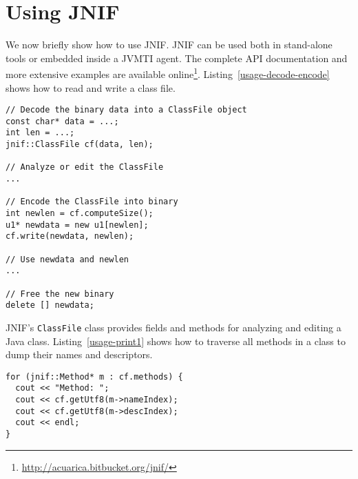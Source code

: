 \section{Using JNIF}
\label{sec:jnif-usage}

 

\lstset{style=mystyle}
\lstset{escapechar=§}


We now briefly show how to use JNIF.
JNIF can be used both in stand-alone tools or embedded inside a JVMTI agent.
The complete API documentation and more extensive examples are available online\footnote{\url{http://acuarica.bitbucket.org/jnif/}}.
Listing~\ref{usage-decode-encode} shows how to read and write a class file.

\begin{lstlisting}[caption=Decoding and encoding a class,label=usage-decode-encode]
// Decode the binary data into a ClassFile object
const char* data = ...;
int len = ...;
jnif::ClassFile cf(data, len);

// Analyze or edit the ClassFile
...

// Encode the ClassFile into binary
int newlen = cf.computeSize();
u1* newdata = new u1[newlen];
cf.write(newdata, newlen);

// Use newdata and newlen
...

// Free the new binary
delete [] newdata;
\end{lstlisting}


JNIF's \texttt{ClassFile} class provides fields and methods for analyzing and editing a Java class.
Listing~\ref{usage-print1} shows how to traverse all methods in a class
to dump their names and descriptors.

\begin{lstlisting}[caption=Traversing all methods in a class,label=usage-print1]
for (jnif::Method* m : cf.methods) {
  cout << "Method: ";
  cout << cf.getUtf8(m->nameIndex);
  cout << cf.getUtf8(m->descIndex);
  cout << endl;
}
\end{lstlisting}

